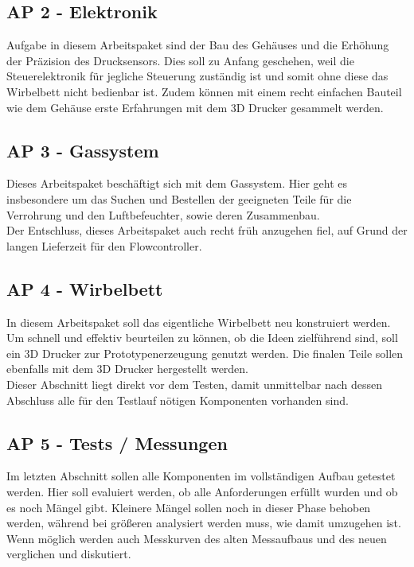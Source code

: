 \subsection{AP 2 - Elektronik}

Aufgabe in diesem Arbeitspaket sind der Bau des Gehäuses und die Erhöhung der Präzision des Drucksensors. Dies soll zu Anfang geschehen, weil die Steuerelektronik für jegliche Steuerung zuständig ist und somit ohne diese das Wirbelbett nicht bedienbar ist. Zudem können mit einem recht einfachen Bauteil wie dem Gehäuse erste Erfahrungen mit dem 3D Drucker gesammelt werden.

\subsection{AP 3 - Gassystem}

Dieses Arbeitspaket beschäftigt sich mit dem Gassystem. Hier geht es insbesondere um das Suchen und Bestellen der geeigneten Teile für die Verrohrung und den Luftbefeuchter, sowie deren Zusammenbau. \\
Der Entschluss, dieses Arbeitspaket auch recht früh anzugehen fiel, auf Grund der langen Lieferzeit für den Flowcontroller. 

\subsection{AP 4 - Wirbelbett}

In diesem Arbeitspaket soll das eigentliche Wirbelbett neu konstruiert werden. Um schnell und effektiv beurteilen zu können, ob die Ideen zielführend sind, soll ein 3D Drucker zur Prototypenerzeugung genutzt werden. Die finalen Teile sollen ebenfalls mit dem 3D Drucker hergestellt werden. \\
Dieser Abschnitt liegt direkt vor dem Testen, damit unmittelbar nach dessen Abschluss alle für den Testlauf nötigen Komponenten vorhanden sind.


\subsection{AP 5 - Tests / Messungen}

Im letzten Abschnitt sollen alle Komponenten im vollständigen Aufbau getestet werden. Hier soll evaluiert werden, ob alle Anforderungen erfüllt wurden und ob es noch Mängel gibt. Kleinere Mängel sollen noch in dieser Phase behoben werden, während bei größeren analysiert werden muss, wie damit umzugehen ist. Wenn möglich werden auch Messkurven des alten Messaufbaus und des neuen verglichen und diskutiert.


